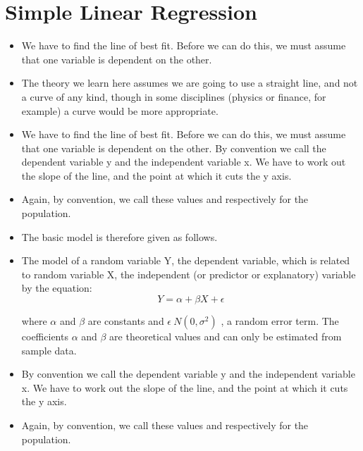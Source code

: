 \documentclass[]{report}
\begin{document}
\section{Simple Linear Regression}
\begin{itemize}
\item	We have to find the line of best fit. Before we can do this, we must assume that one
		variable is dependent on the other. 
		
	\item The theory we learn here assumes we are going to use a straight line, and not a curve of any kind, though in some disciplines (physics or finance, for example) a curve would be more appropriate.
	
	\item We have to find the line of best fit. Before we can do this, we must assume that one
	variable is dependent on the other. By convention we call the dependent variable y
	and the independent variable x. We have to work out the slope of the line, and the
	point at which it cuts the y axis.
	
	\item Again, by convention, we call these values and respectively for the population.
	
	\item The basic model is therefore given as follows.
	
	\item The model of a random variable Y, the dependent variable, which is related to random
	variable X, the independent (or predictor or explanatory) variable by the equation:
	\begin{equation}
	Y = \alpha + \beta X + \epsilon
	\end{equation}
	
	where $\alpha$ and $\beta$ are constants and $\epsilon ~ N ( 0,\sigma^2)$ , a random error term. The
	coefficients $\alpha$ and $\beta$  are theoretical values and can only be estimated from sample data.
\end{itemize}

\begin{itemize}

	\item By convention we call the dependent variable y
	and the independent variable x. We have to work out the slope of the line, and the
	point at which it cuts the y axis.
	
	\item	Again, by convention, we call these values and respectively for the population.
\end{itemize}
\end{document}
